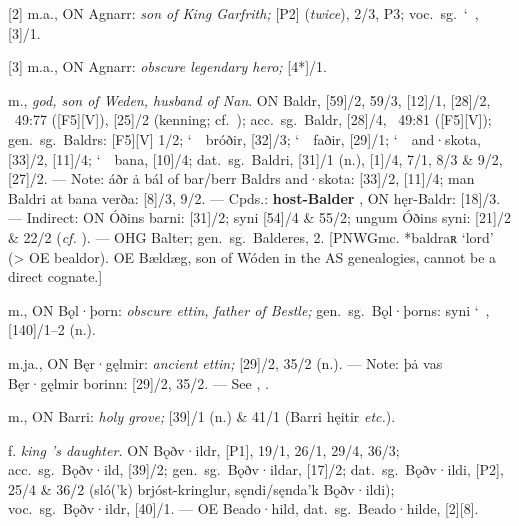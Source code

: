 \begin{itemize}
[2] m.a., ON Agnarr:
  \emph{son of King Garfrith;} [P2] (\emph{twice}), 2/3, P3; voc.~sg.~\char`~, [3]/1.

[3] m.a., ON Agnarr:
  \emph{obscure legendary hero;} [4*]/1.

 m., \emph{god, son of Weden, husband of Nan}.
  ON Baldr, [59]/2, 59/3, [12]/1, [28]/2, \Gylfaginning~49:77 ([F5][V]), [25]/2 (kenning; cf.~); %
  acc.~sg.~Baldr, [28]/4, \Gylfaginning~49:81 ([F5][V]); %
  gen.~sg.~Baldrs: [F5][V] 1/2; \char`~\ bróðir, [32]/3; \char`~\ faðir, [29]/1; \char`~\ and·skota, [33]/2, [11]/4; \char`~\ bana, [10]/4; %
  dat.~sg.~Baldri, [31]/1 (n.), [1]/4, 7/1, 8/3 \& 9/2, [27]/2.
  --- Note: áðr ȧ bál of bar/berr Baldrs and·skota: [33]/2, [11]/4; man Baldri at bana verða: [8]/3, 9/2.
  --- Cpds.: \textbf{host-Balder} , ON hęr-Baldr: [18]/3.
  --- Indirect: ON Óðins barni: [31]/2; syni [54]/4 \& 55/2; ungum Óðins syni: [21]/2 \& 22/2 (\emph{cf.} ).
  --- OHG Balter; gen.~sg.~Balderes,  2.
  [PNWGmc. *baldraʀ ‘lord’ (> OE bealdor).  OE Bældæg, son of Wóden in the AS genealogies, cannot be a direct cognate.]

 m., ON Bǫl·þorn:
  \emph{obscure ettin, father of Bestle;} gen.~sg.~Bǫl·þorns: syni \char`~, [140]/1--2 (n.).

 m.ja., ON Bęr·gęlmir:
  \emph{ancient ettin;} [29]/2, 35/2 (n.). --- Note: þȧ vas Bęr·gęlmir borinn: [29]/2, 35/2. --- See , .

 m., ON Barri:
  \emph{holy grove;} [39]/1 (n.) \& 41/1 (Barri hęitir \emph{etc.}).

 f.
  \emph{king ’s daughter.}
  ON Bǫðv·ildr, [P1], 19/1, 26/1, 29/4, 36/3;
  acc.~sg.~Bǫðv·ild, [39]/2;
  gen.~sg.~Bǫðv·ildar, [17]/2;
  dat.~sg.~Bǫðv·ildi, [P2], 25/4 \& 36/2 (sló(’k) brjóst-kringlur, sęndi/sęnda’k Bǫðv·ildi);
  voc.~sg.~Bǫðv·ildr, [40]/1. ---
  OE Beado·hild, dat.~sg.~Beado·hilde, [2][8].


\end{itemize}
